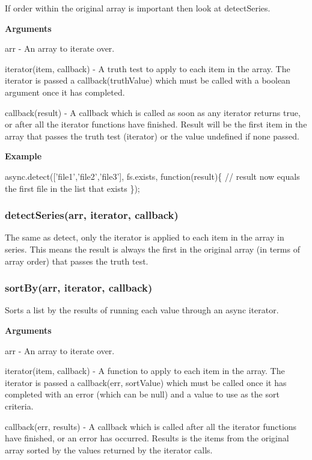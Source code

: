 If order within the original array is important then look at detect\+Series.

{\bfseries Arguments}


\begin{DoxyItemize}
\item arr -\/ An array to iterate over.
\item iterator(item, callback) -\/ A truth test to apply to each item in the array. The iterator is passed a callback(truth\+Value) which must be called with a boolean argument once it has completed.
\item callback(result) -\/ A callback which is called as soon as any iterator returns true, or after all the iterator functions have finished. Result will be the first item in the array that passes the truth test (iterator) or the value undefined if none passed.
\end{DoxyItemize}

{\bfseries Example}


\begin{DoxyCode}
async.detect(['file1','file2','file3'], fs.exists, function(result)\{
    // result now equals the first file in the list that exists
\});
\end{DoxyCode}
 



\label{_detectSeries}%
 \subsubsection*{detect\+Series(arr, iterator, callback)}

The same as detect, only the iterator is applied to each item in the array in series. This means the result is always the first in the original array (in terms of array order) that passes the truth test.





\label{_sortBy}%
 \subsubsection*{sort\+By(arr, iterator, callback)}

Sorts a list by the results of running each value through an async iterator.

{\bfseries Arguments}


\begin{DoxyItemize}
\item arr -\/ An array to iterate over.
\item iterator(item, callback) -\/ A function to apply to each item in the array. The iterator is passed a callback(err, sort\+Value) which must be called once it has completed with an error (which can be null) and a value to use as the sort criteria.
\item callback(err, results) -\/ A callback which is called after all the iterator functions have finished, or an error has occurred. Results is the items from the original array sorted by the values returned by the iterator calls.
\end{DoxyItemize}

